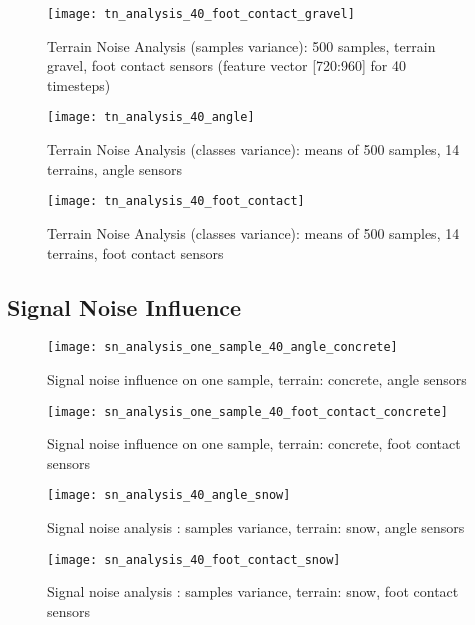 \begin{figure}[H]
  \centering
  \texttt{[image: tn\_analysis\_40\_foot\_contact\_gravel]}
  \caption{Terrain Noise Analysis (samples variance): 500 samples, terrain gravel, foot contact sensors (feature vector [720:960] for 40 timesteps)}
  \label{fig:tn_analysis_foot_contact_gravel}
\end{figure}

\begin{figure}[H]
  \centering
  \texttt{[image: tn\_analysis\_40\_angle]}
  \caption{Terrain Noise Analysis (classes variance): means of 500 samples, 14 terrains, angle sensors}
  \label{fig:tn_analysis_angle}
\end{figure}

\begin{figure}[H]
  \centering
  \texttt{[image: tn\_analysis\_40\_foot\_contact]}
  \caption{Terrain Noise Analysis (classes variance): means of 500 samples, 14 terrains, foot contact sensors}
  \label{fig:tn_analysis_foot_contact}
\end{figure}

\subsection{Signal Noise Influence} \label{ssec:signal_noise_influence}

\begin{figure}[H]
  \centering
  \texttt{[image: sn\_analysis\_one\_sample\_40\_angle\_concrete]}
  \caption{Signal noise influence on one sample, terrain: concrete, angle sensors}
  \label{fig:sn_analysis_one_sample_angle_concrete}
\end{figure}

\begin{figure}[H]
  \centering
  \texttt{[image: sn\_analysis\_one\_sample\_40\_foot\_contact\_concrete]}
  \caption{Signal noise influence on one sample, terrain: concrete, foot contact sensors}
  \label{fig:sn_analysis_one_sample_foot_contact_concrete}
\end{figure}

\begin{figure}[H]
  \centering
  \texttt{[image: sn\_analysis\_40\_angle\_snow]}
  \caption{Signal noise analysis : samples variance, terrain: snow, angle sensors}
  \label{fig:sn_analysis_angle_snow}
\end{figure}

\begin{figure}[H]
  \centering
  \texttt{[image: sn\_analysis\_40\_foot\_contact\_snow]}
  \caption{Signal noise analysis : samples variance, terrain: snow, foot contact sensors}
  \label{fig:sn_analysis_foot_contact_snow}
\end{figure}

